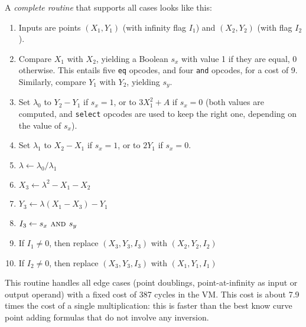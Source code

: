 \documentclass{llncs}
\begin{document}
A \emph{complete routine} that supports all cases looks like this:
\begin{enumerate}

    \item Inputs are points $(X_1, Y_1)$ (with infinity flag $I_1$) and
    $(X_2, Y_2)$ (with flag $I_2$).

    \item Compare $X_1$ with $X_2$, yielding a Boolean $s_x$ with value
    1 if they are equal, 0 otherwise. This entails five \verb+eq+ opcodes,
    and four \verb+and+ opcodes, for a cost of 9. Similarly, compare
    $Y_1$ with $Y_2$, yielding $s_y$.

    \item Set $\lambda_0$ to $Y_2 - Y_1$ if $s_x = 1$, or to $3 X_1^2 + A$
    if $s_x = 0$ (both values are computed, and \verb+select+ opcodes are
    used to keep the right one, depending on the value of $s_x$).

    \item Set $\lambda_1$ to $X_2 - X_1$ if $s_x = 1$, or to $2 Y_1$ if
    $s_x = 0$.

    \item $\lambda \leftarrow \lambda_0 / \lambda_1$

    \item $X_3 \leftarrow \lambda^2 - X_1 - X_2$

    \item $Y_3 \leftarrow \lambda (X_1 - X_3) - Y_1$

    \item $I_3 \leftarrow s_x \text{\textsc{\ and\ }} s_y$

    \item If $I_1 \neq 0$, then replace $(X_3, Y_3, I_3)$ with $(X_2, Y_2, I_2)$

    \item If $I_2 \neq 0$, then replace $(X_3, Y_3, I_3)$ with $(X_1, Y_1, I_1)$

\end{enumerate}

This routine handles all edge cases (point doublings, point-at-infinity
as input or output operand) with a fixed cost of 387 cycles in the VM.
This cost is about 7.9 times the cost of a single multiplication: this
is faster than the best know curve point adding formulas that do not
involve any inversion.
\end{document}
